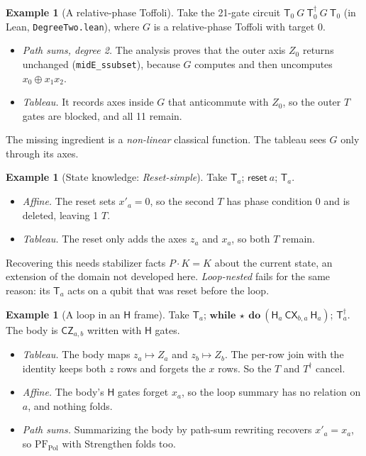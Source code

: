 \documentclass[11pt]{article}
\theoremstyle{definition}
\newtheorem{example}[theorem]{Example}
\theoremstyle{remark}
\newcommand{\adj}{^{\dagger}}
\newcommand{\gate}[1]{\mathsf{#1}}
\begin{document}
\begin{example}[A relative-phase Toffoli]
\label{ex:al-toffoli}
Take the 21-gate circuit $\gate T_0\ G\ \gate T\adj_0\ G\ \gate T_0$ (in Lean,
\texttt{DegreeTwo.lean}), where $G$ is a relative-phase Toffoli with target $0$.
\begin{itemize}[nosep]
  \item \emph{Path sums, degree 2.} The analysis proves that the outer axis $Z_0$ returns
  unchanged (\texttt{midE\_ssubset}), because $G$ computes and then uncomputes
  $x_0 \oplus x_1x_2$.
  \item \emph{Tableau.} It records axes inside $G$ that anticommute with $Z_0$, so the outer
  $T$ gates are blocked, and all 11 remain.
\end{itemize}
The missing ingredient is a \emph{non-linear} classical function. The tableau sees $G$ only
through its axes.
\end{example}

\begin{example}[State knowledge: \emph{Reset-simple}]\label{ex:al-reset}
Take $\gate T_a$; $\mathsf{reset}\ a$; $\gate T_a$.
\begin{itemize}[nosep]
  \item \emph{Affine.} The reset sets $x'_a = 0$, so the second $T$ has phase condition 0
  and is deleted, leaving 1 $T$.
  \item \emph{Tableau.} The reset only adds the axes $z_a$ and $x_a$, so both $T$ remain.
\end{itemize}
Recovering this needs stabilizer facts $P\cdot K = K$ about the current state, an extension
of the domain not developed here. \emph{Loop-nested} fails for the same reason: its
$\gate T_a$ acts on a qubit that was reset before the loop.
\end{example}

\begin{example}[A loop in an $\gate H$ frame]
\label{ex:al-loop-h}
Take $\gate T_a$; $\textbf{while}\ \star\ \textbf{do}\ (\gate H_a\ \gate{CX}_{b,a}\
\gate H_a)$; $\gate T\adj_a$. The body is $\gate{CZ}_{a,b}$ written with $\gate H$ gates.
\begin{itemize}[nosep]
  \item \emph{Tableau.} The body maps $z_a \mapsto Z_a$ and $z_b \mapsto Z_b$. The per-row
  join with the identity keeps both $z$ rows and forgets the $x$ rows. So the $T$ and
  $T\adj$ cancel.
  \item \emph{Affine.} The body's $\gate H$ gates forget $x_a$, so the loop summary has no
  relation on $a$, and nothing folds.
  \item \emph{Path sums.} Summarizing the body by path-sum rewriting recovers
  $x'_a = x_a$, so $\mathrm{PF}_{\mathrm{Pol}}$ with Strengthen folds too.
\end{itemize}
\end{example}
\end{document}
